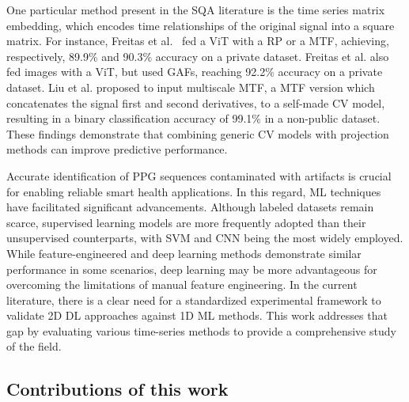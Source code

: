 \documentclass[final,3p,times,twocolumn]{elsarticle}
\begin{document}
One particular method present in the \gls{SQA} literature is the time series matrix embedding, which encodes time relationships of the original signal into a square matrix.
For instance, Freitas et al.~\cite{imaging-4} fed a \gls{ViT} with a \gls{RP} or a \gls{MTF}, achieving, respectively, 89.9\% and 90.3\% accuracy on a private dataset. Freitas et al. \cite{imaging-5} also fed images with a \gls{ViT}, but used \glspl{GAF}, reaching 92.2\% accuracy on a private dataset.
Liu et al. \cite{imaging-6} proposed to input multiscale \gls{MTF}, a \gls{MTF} version which concatenates the signal first and second derivatives, to a self-made \gls{CV} model, resulting in a binary classification accuracy of 99.1\% in a non-public dataset.
These findings demonstrate that combining generic \gls{CV} models with projection methods can improve predictive performance.

Accurate identification of \gls{PPG} sequences contaminated with artifacts is crucial for enabling reliable smart health applications.
In this regard, \gls{ML} techniques have facilitated significant advancements.
Although labeled datasets remain scarce, supervised learning models are more frequently adopted than their unsupervised counterparts, with \gls{SVM} and \gls{CNN} being the most widely employed.
While feature-engineered and deep learning methods demonstrate similar performance in some scenarios, deep learning may be more advantageous for overcoming the limitations of manual feature engineering.
In the current literature, there is a clear need for a standardized experimental framework to validate 2D \gls{DL} approaches against 1D \gls{ML} methods.
This work addresses that gap by evaluating various time-series methods to provide a comprehensive study of the field.



\subsection{Contributions of this work}
\label{sec:my_work}
\end{document}
